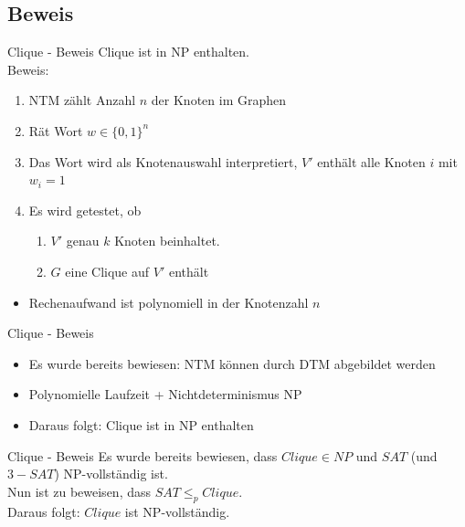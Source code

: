 \documentclass[12pt,donthandout,notes=dontshow,xcolor=table]{beamer}
\begin{document}
\subsection{Beweis}
\begin{frame}{Clique - Beweis}
Clique ist in NP enthalten.\\
Beweis:\\
\begin{enumerate}
\item NTM zählt Anzahl \(n\) der Knoten im Graphen
\pause
\item Rät Wort \(w \in \{0,1\}^n\)
\pause
\item Das Wort wird als Knotenauswahl interpretiert, \(V'\) enthält alle Knoten \(i\) mit \(w_i = 1\)
\pause
\item Es wird getestet, ob
\begin{enumerate}
\item \(V'\) genau \(k\) Knoten beinhaltet.
\item \(G\) eine Clique auf \(V'\) enthält
\end{enumerate}
\end{enumerate}
\pause
\begin{itemize}
\item Rechenaufwand ist polynomiell in der Knotenzahl \(n\)
\end{itemize}
\end{frame}

\begin{frame}{Clique - Beweis}
\begin{itemize}
\item Es wurde bereits bewiesen: NTM können durch DTM abgebildet werden
\item Polynomielle Laufzeit + Nichtdeterminismus \textrightarrow NP
\item Daraus folgt: Clique ist in NP enthalten
\end{itemize}
\end{frame}

\begin{frame}{Clique - Beweis}
Es wurde bereits bewiesen, dass \(Clique \in NP\) und \(SAT\) (und \(3-SAT\)) NP-vollständig ist.\\
Nun ist zu beweisen, dass \(SAT \leq_p Clique\).\\
Daraus folgt: \(Clique\) ist NP-vollständig.
\end{frame}
\end{document}
